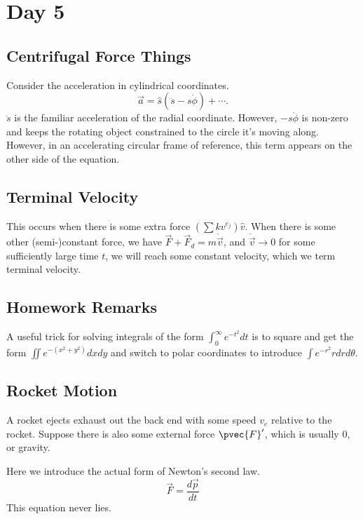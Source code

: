 \section{Day 5}

\subsection{Centrifugal Force Things}
Consider the acceleration in cylindrical coordinates.
\[ \vec{a} = \hat{s} (\ddot{s} - s \dot{\phi}) + \cdots. \]
$\ddot{s}$ is the familiar acceleration of the radial coordinate.
However, $-s\dot{\phi}$ is non-zero and keeps the rotating object
constrained to the circle it's moving along. However, in an accelerating
circular frame of reference, this term appears on the other side of the
equation.

\subsection{Terminal Velocity}
This occurs when there is some extra force $\left(\sum kv^{e_j}\right)
\hat{v}$. When there is some other (semi-)constant force, we have
$\vec{F} + \vec{F}_d = m \dot{\vec{v}}$, and $\dot{\vec{v}} \to 0$ for
some sufficiently large time $t$, we will reach some constant velocity,
which we term terminal velocity.

\subsection{Homework Remarks}
A useful trick for solving integrals of the form $\int_0^\infty e^{-t^2}
dt$ is to square and get the form $\iint e^{-(x^2 + y^2)} dx dy$ and
switch to polar coordinates to introduce $\int e^{-r^2} r dr d \theta$.

\subsection{Rocket Motion}
A rocket ejects exhaust out the back end with some speed $v_{e}$ relative
to the rocket. Suppose there is also some external force $\pvec{F}'$,
which is usually $0$, or gravity.

\begin{rem}
Here we introduce the actual form of Newton's second law.
\[ \vec{F} = \frac{d\vec{p}}{dt} \]
This equation never lies.
\end{rem}

